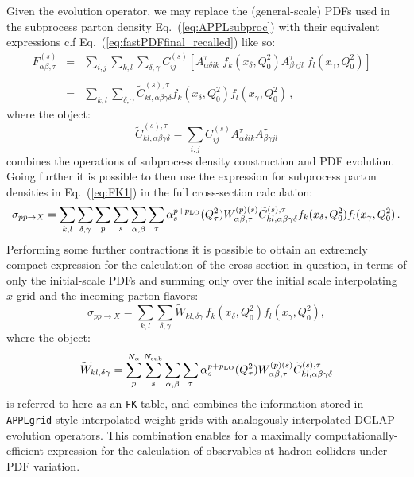 \documentclass[preprint,12pt]{elsarticle}
\begin{document}
Given the evolution operator, we may replace the (general-scale) PDFs
used in the subprocess parton density Eq.~(\ref{eq:APPLsubproc}) with
their equivalent expressions c.f Eq.~(\ref{eq:fastPDFfinal_recalled})
like so:
\begin{equation}\label{eq:FK1}
\begin{array}{rcl}
F^{(s)}_{\alpha\beta,\tau} &=&  \displaystyle \sum_{i,j} \sum_{k,l}
                               \sum_{\delta,\gamma} C^{(s)}_{ij}
                               \left[  A^\tau_{\alpha\delta ik}\;
                               f_k(x_\delta,Q^2_0) A^\tau_{\beta\gamma
                               jl}\; f_l(x_\gamma,Q^2_0) \right]\;\;\;
  \\
\\
&=& \displaystyle \sum_{k,l}\sum_{\delta,\gamma}
\widetilde{C}^{(s),\tau}_{kl,\alpha\beta\gamma\delta}
f_k(x_\delta,Q^2_0) f_l(x_\gamma,Q^2_0)\,,
\end{array}
\end{equation}
where the object:
\begin{equation}
  \widetilde{C}^{(s),\tau}_{kl,\alpha\beta\gamma\delta} =
  \sum_{i,j} C^{(s)}_{ij} A^\tau_{\alpha\delta ik}
  A^\tau_{\beta\gamma jl}
\end{equation}
combines the operations of subprocess density construction and PDF
evolution. Going further it is possible to then use the expression for
subprocess parton densities in Eq.~(\ref{eq:FK1}) in the full
cross-section calculation:
\begin{equation}
\sigma_{pp\to X} = \sum_{k,l}\sum_{\delta,\gamma}\sum_p
\sum_{s} \sum_{\alpha,\beta}
\sum_{\tau} 
\alpha_s^{p+p_{\rm LO}}(Q^2_\tau)W_{\alpha\beta,\tau}^{(p)(s)} \widetilde{C}^{(s),\tau}_{kl,\alpha\beta\gamma\delta}
f_k(x_\delta,Q^2_0) f_l(x_\gamma,Q^2_0)\,.
\end{equation}
Performing some further contractions it is possible to obtain an
extremely compact expression for the calculation of the cross section
in question, in terms of only the initial-scale PDFs and summing only
over the initial scale interpolating $x$-grid and the incoming parton
flavors:
\begin{equation}\label{eq:FK}
  \sigma _{pp\to X} = \sum_{k,l}\sum_{\delta,\gamma} 
  \widetilde{W}_{kl,\delta\gamma} \,f_k(x_\delta,Q^2_0) f_l(x_\gamma,Q^2_0),
\end{equation}
where the object:
\begin{equation}\label{eq:FKTable}
  \widetilde{W}_{kl,\delta\gamma} = \sum_p^{N_\alpha} \sum_{s}^{N_{\mathrm{sub}}} \sum_{\alpha,\beta} \sum_{\tau}
\alpha_s^{p+p_{\rm LO}}(Q^2_\tau)  W_{\alpha\beta,\tau}^{(p)(s)} \widetilde{C}^{(s),\tau}_{kl,\alpha\beta\gamma\delta}
\end{equation}
is referred to here as an {\tt FK} table, and combines the information
stored in {\tt APPLgrid}-style interpolated weight grids with
analogously interpolated DGLAP evolution operators. This combination
enables for a maximally computationally-efficient expression for the
calculation of observables at hadron colliders under PDF variation.
\end{document}

